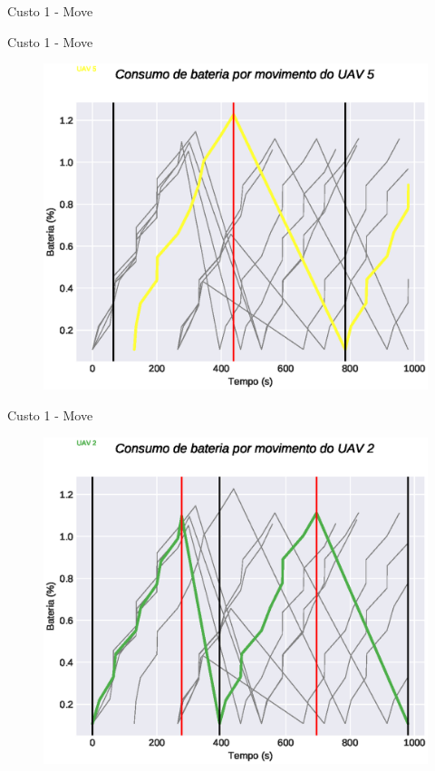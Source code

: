 \begin{frame}{Custo 1 - Move}
\begin{figure}[!htb]
                 \end{figure}
            \end{frame}\begin{frame}{Custo 1 - Move}
                \begin{figure}[!htb]
                     \includegraphics[width=\textwidth]{custo_1/uav_move_acum_uav_5.eps}
                 \end{figure}
            \end{frame}\begin{frame}{Custo 1 - Move}
                \begin{figure}[!htb]
                     \includegraphics[width=\textwidth]{custo_1/uav_move_acum_uav_2.eps}

\end{figure}
\end{frame}
